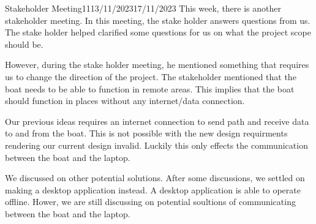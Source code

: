 \documentclass[12pt]{article}
\begin{document}
\begin{logbook-entry}{Stakeholder Meeting}{11}{13/11/2023}{17/11/2023}
This week, there is another stakeholder meeting.
In this meeting, the stake holder answers questions from us.
The stake holder helped clarified some questions for us on what the project scope should be.

However, during the stake holder meeting, he mentioned something that requires us to change the direction of the project.
The stakeholder mentioned that the boat needs to be able to function in remote areas.
This implies that the boat should function in places without any internet/data connection.

Our previous ideas requires an internet connection to send path and receive data to and from the boat.
This is not possible with the new design requirments rendering our current design invalid.
Luckily this only effects the communication between the boat and the laptop.

We discussed on other potential solutions.
After some discussions, we settled on making a desktop application instead.
A desktop application is able to operate offline.
Hower, we are still discussing on potential soultions of communicating between the boat and the laptop.
\end{logbook-entry}
\end{document}
